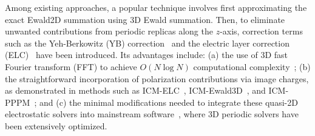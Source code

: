 Among existing approaches, a popular technique involves first approximating the exact Ewald2D summation using 3D Ewald summation. 
Then, to eliminate unwanted contributions from periodic replicas along the $z$-axis, correction terms such as the Yeh-Berkowitz (YB) correction~\cite{yeh1999ewald,dos2015electrolytes} and the electric layer correction (ELC)~\cite{arnold2002electrostatics,tyagi2008electrostatic} have been introduced.
Its advantages include: (a) the use of 3D fast Fourier transform (FFT) to achieve $ O(N\log N)$ computational complexity~\cite{yuan2021particle,huang2024pmc}; 
(b) the straightforward incorporation of polarization contributions via image charges, as demonstrated in methods such as ICM-ELC~\cite{tyagi2008electrostatic}, ICM-Ewald3D~\cite{dos2015electrolytes}, and ICM-PPPM~\cite{yuan2021particle}; 
and (c) the minimal modifications needed to integrate these quasi-2D electrostatic solvers into mainstream software~\cite{ABRAHAM201519,thompson2021lammps}, where 3D periodic solvers have been extensively optimized.



